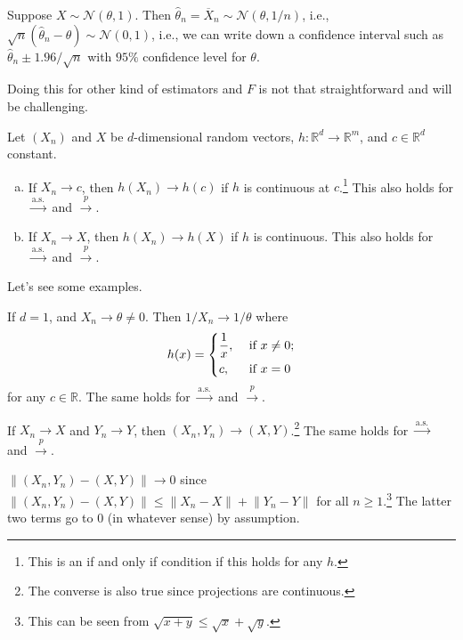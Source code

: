 \begin{eg}
	Suppose \(X \sim \mathcal{N} (\theta , 1)\). Then \(\hat{\theta} _n = \overline{X} _n \sim \mathcal{N} (\theta , 1 / n)\), i.e., \(\sqrt{n} (\hat{\theta} _n - \theta ) \sim \mathcal{N} (0, 1)\), i.e., we can write down a confidence interval such as \(\hat{\theta} _n \pm 1.96 / \sqrt{n} \) with \(95\%\) confidence level for \(\theta \).
\end{eg}

Doing this for other kind of estimators and \(F\) is not that straightforward and will be challenging.

\begin{remark}
	Let \((X_n)\) and \(X\) be \(d\)-dimensional random vectors, \(h \colon \mathbb{R} ^d \to \mathbb{R} ^m\), and \(c \in \mathbb{R} ^d\) constant.
	\begin{enumerate}[(a)]
		\item If \(X_n \to c\), then \(h(X_n) \to h(c)\) if \(h\) is continuous at \(c\).\footnote{This is an if and only if condition if this holds for any \(h\).} This also holds for \(\overset{\text{a.s.} }{\to } \) and \(\overset{p}{\to } \).
		\item If \(X_n \to X\), then \(h(X_n) \to h(X)\) if \(h\) is continuous. This also holds for \(\overset{\text{a.s.} }{\to }\) and \(\overset{p}{\to } \).
	\end{enumerate}
\end{remark}

Let's see some examples.

\begin{eg}
	If \(d = 1\), and \(X_n \to \theta \neq 0\). Then \(1 / X_n \to 1 / \theta \) where
	\[
		h(x) = \begin{dcases}
			\frac{1}{x}, & \text{ if } x \neq 0 ; \\
			c,           & \text{ if } x = 0
		\end{dcases}
	\]
	for any \(c \in \mathbb{R} \). The same holds for \(\overset{\text{a.s.} }{\to }\) and \(\overset{p}{\to } \).
\end{eg}

\begin{eg}
	If \(X_n \to X\) and \(Y_n \to Y\), then \((X_n, Y_n) \to (X, Y)\).\footnote{The converse is also true since projections are continuous.} The same holds for \(\overset{\text{a.s.} }{\to } \) and \(\overset{p}{\to } \).
\end{eg}
\begin{explanation}
	\(\lVert (X_n, Y_n) - (X, Y) \rVert \to 0\) since \(\lVert (X_n, Y_n ) - (X, Y) \rVert \leq \lVert X_n - X \rVert + \lVert Y_n - Y \rVert\) for all \(n \geq 1\).\footnote{This can be seen from \(\sqrt{x + y} \leq \sqrt{x} + \sqrt{y} \).} The latter two terms go to \(0\) (in whatever sense) by assumption.
\end{explanation}